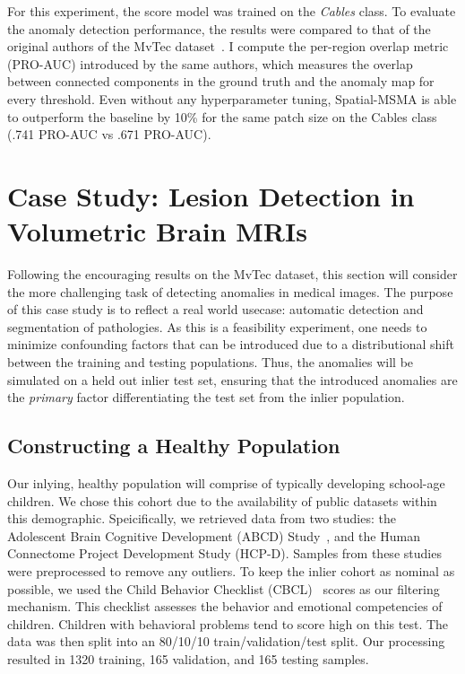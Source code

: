 For this experiment, the score model was trained on the \textit{Cables} class. To evaluate the anomaly detection performance, the results were compared to that of the original authors of the MvTec dataset~\cite{bergmann2020uninformed}. I compute the per-region overlap metric (PRO-AUC) introduced by the same authors, which measures the overlap between connected components in the ground truth and the anomaly map for every threshold. Even without any hyperparameter tuning, Spatial-MSMA is able to outperform the baseline by 10\% for the same patch size on the Cables class (.741 PRO-AUC vs .671 PRO-AUC).


\section{Case Study: Lesion Detection in Volumetric Brain MRIs}
Following the encouraging results on the MvTec dataset, this section will consider the more challenging task of detecting anomalies in medical images. The purpose of this case study is to reflect a real world usecase: automatic detection and segmentation of pathologies. As this is a feasibility experiment, one needs to minimize confounding factors that can be introduced due to a distributional shift between the training and testing populations. Thus, the anomalies will be simulated on a held out inlier test set, ensuring that the introduced anomalies are the \textit{primary} factor differentiating the test set from the inlier population.

\subsection*{Constructing a Healthy Population}

Our inlying, healthy population will comprise of typically developing school-age children. We chose this cohort due to the availability of public datasets within this demographic. Speicifically, we retrieved data from two studies: the Adolescent Brain Cognitive Development (ABCD) Study~\citep{Casey2018adolescent}, and the Human Connectome Project Development Study (HCP-D). Samples from these studies were preprocessed to remove any outliers. To keep the inlier cohort as nominal as possible, we used the Child Behavior Checklist (CBCL)~\cite{achenbachChildBehaviorChecklist1999} scores as our filtering mechanism. This checklist assesses the behavior and emotional competencies of children. Children with behavioral problems tend to score high on this test. The data was then split into an 80/10/10 train/validation/test split. Our processing resulted in 1320 training, 165 validation, and 165 testing samples. 

